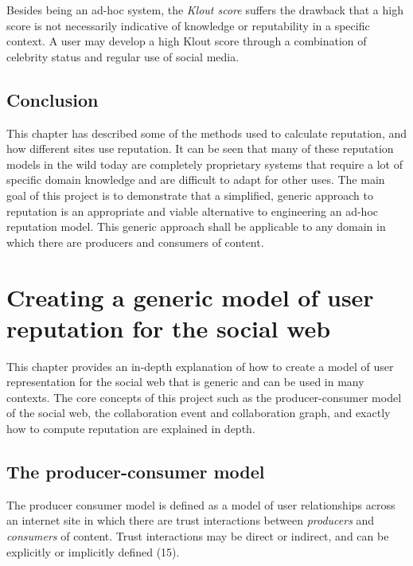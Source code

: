 \documentclass[]{final_report}
\begin{document}
Besides being an ad-hoc system, the \textsl{Klout score} suffers the drawback that a high score is not necessarily indicative of knowledge or reputability in a specific context. A user may develop a high Klout score through a combination of celebrity status and regular use of social media.

\section{Conclusion}

This chapter has described some of the methods used to calculate reputation, and how different sites use reputation. It can be seen that many of these reputation models in the wild today are completely proprietary systems that require a lot of specific domain knowledge and are difficult to adapt for other uses. The main goal of this project is to demonstrate that a simplified, generic approach to reputation is an appropriate and viable alternative to engineering an ad-hoc reputation model. This generic approach shall be applicable to any domain in which there are producers and consumers of content.

\chapter{Creating a generic model of user reputation for the social web}
This chapter provides an in-depth explanation of how to create a model of user representation for the social web that is generic and can be used in many contexts. The core concepts of this project such as the producer-consumer model of the social web, the collaboration event and collaboration graph, and exactly how to compute reputation are explained in depth.

\section{The producer-consumer model}

The producer consumer model is defined as a model of user relationships across an internet site in which there are trust interactions between \textsl{producers} and \textsl{consumers} of content. Trust interactions may be direct or indirect, and can be explicitly or implicitly defined (15).
\end{document}
